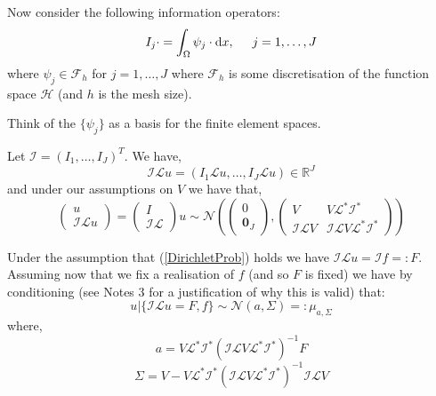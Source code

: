 Now consider the following information operators:
\begin{equation*}
    I_{j}\cdot=\int_{\Omega}\psi_{j}\cdot\mathrm{d}x, \hspace{0.5cm} j=1,\dots,J
\end{equation*}
where $\psi_{j}\in\mathcal{F}_{h}$ for $j=1,\dots,J$ where $\mathcal{F}_{h}$ is some discretisation of the function space $\mathcal{H}$ (and $h$ is the mesh size).
\begin{remark}
Think of the $\{\psi_{j}\}$ as a basis for the finite element spaces.
\end{remark}

Let $\mathcal{I}=(I_1,\dots,I_J)^T$. We have,
\begin{equation*}
    \mathcal{I}\mathcal{L}u=(I_{1}\mathcal{L}u,\dots,I_{J}\mathcal{L}u)\in\mathbb{R}^{J}
\end{equation*}
and under our assumptions on $V$ we have that,
\begin{equation}
    \label{jointInfoDist}
    \begin{pmatrix}
    u \\
    \mathcal{I}\mathcal{L}u
    \end{pmatrix} =
    \begin{pmatrix}
    I \\ \mathcal{I}\mathcal{L}
    \end{pmatrix} u \sim \mathcal{N}\left(
    \begin{pmatrix}
    0 \\
    \mathbf{0}_J
    \end{pmatrix},
    \begin{pmatrix}
    V & V\mathcal{L}^{*}\mathcal{I}^{*} \\
    \mathcal{I}\mathcal{L}V & \mathcal{I}\mathcal{L}V\mathcal{L}^{*}\mathcal{I}^{*}
    \end{pmatrix}
    \right)
\end{equation}

Under the assumption that (\ref{DirichletProb}) holds we have $\mathcal{I}\mathcal{L}u=\mathcal{I}f=:F$. Assuming now that we fix a realisation of $f$ (and so $F$ is fixed) we have by conditioning (see Notes 3 for a justification of why this is valid) that:
\begin{equation}
    \label{conditionalDistnFixed_f}
    u|\{\mathcal{I}\mathcal{L}u=F,f\}\sim\mathcal{N}(a,\Sigma)=:\mu_{a,\Sigma}
\end{equation}
where,
\begin{equation}
    \label{post_mean_before_averaging}
    a = V\mathcal{L}^{*}\mathcal{I}^{*}(\mathcal{I}\mathcal{L}V\mathcal{L}^{*}\mathcal{I}^{*})^{-1}F
\end{equation}
\begin{equation}
    \label{post_var_before_averaging}
    \Sigma = V - V\mathcal{L}^{*}\mathcal{I}^{*}(\mathcal{I}\mathcal{L}V\mathcal{L}^{*}\mathcal{I}^{*})^{-1}\mathcal{I}\mathcal{L}V
\end{equation}

